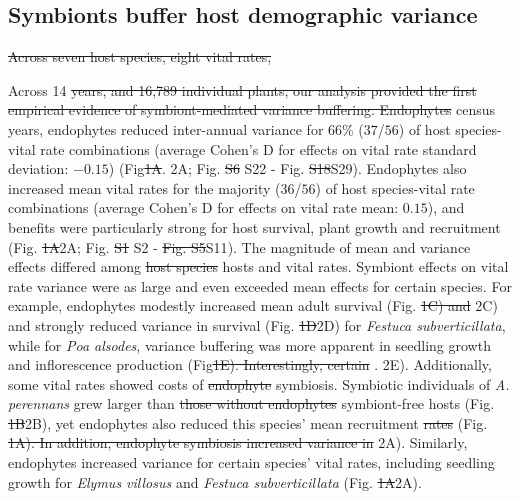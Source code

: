 \documentclass[lineno,sn-nature]{sn-jnl}%
\providecommand{\DIFadd}[1]{{\protect\color{blue}#1}} %
\providecommand{\DIFdel}[1]{{\protect\color{red}\protect\scriptsize\sout{#1}}}
\providecommand{\DIFadd}[1]{{\protect\color{blue}\uwave{#1}}} %
\providecommand{\DIFdel}[1]{{\protect\color{red}\sout{#1}}}                      %
\providecommand{\DIFaddbegin}{} %
\providecommand{\DIFaddend}{} %
\providecommand{\DIFdelbegin}{} %
\providecommand{\DIFdelend}{} %
\newcommand{\DIFscaledelfig}{0.5}
\newlength{\DIFdelgraphicswidth} %
\newlength{\DIFdelgraphicsheight} %
\newcommand{\DIFaddincludegraphics}[2][]{{\color{blue}\fbox{\DIFOincludegraphics[#1]{#2}}}} %
\newcommand{\DIFdelincludegraphics}[2][]{%
\sbox{\DIFdelgraphicsbox}{\DIFOincludegraphics[#1]{#2}}%
\settoboxwidth{\DIFdelgraphicswidth}{\DIFdelgraphicsbox} %
\settoboxtotalheight{\DIFdelgraphicsheight}{\DIFdelgraphicsbox} %
\scalebox{\DIFscaledelfig}{%
\parbox[b]{\DIFdelgraphicswidth}{\usebox{\DIFdelgraphicsbox}\\[-\baselineskip] \rule{\DIFdelgraphicswidth}{0em}}\llap{\resizebox{\DIFdelgraphicswidth}{\DIFdelgraphicsheight}{%
\setlength{\unitlength}{\DIFdelgraphicswidth}%
\begin{picture}(1,1)%
\thicklines\linethickness{2pt} %
{\color[rgb]{1,0,0}\put(0,0){\framebox(1,1){}}}%
{\color[rgb]{1,0,0}\put(0,0){\line( 1,1){1}}}%
{\color[rgb]{1,0,0}\put(0,1){\line(1,-1){1}}}%
\end{picture}%
}\hspace*{3pt}}} %
} %
\DeclareRobustCommand{\DIFaddbegin}{\DIFOaddbegin \let\includegraphics\DIFaddincludegraphics} %
\DeclareRobustCommand{\DIFaddend}{\DIFOaddend \let\includegraphics\DIFOincludegraphics} %
\DeclareRobustCommand{\DIFdelbegin}{\DIFOdelbegin \let\includegraphics\DIFdelincludegraphics} %
\DeclareRobustCommand{\DIFdelend}{\DIFOaddend \let\includegraphics\DIFOincludegraphics} %
\begin{document}
\subsection*{Symbionts buffer host demographic variance}

\DIFdelbegin \DIFdel{Across seven host species, eight vital rates, }\DIFdelend \DIFaddbegin 

\DIFadd{Across }\DIFaddend 14 \DIFdelbegin \DIFdel{years, and 16,789 individual plants, our analysis provided the first empirical evidence of symbiont-mediated variance buffering. 
Endophytes }\DIFdelend \DIFaddbegin \DIFadd{census years, endophytes }\DIFaddend reduced inter-annual variance for 66\% ($37$/$56$) of host species-vital rate combinations (average Cohen's D for effects on vital rate standard deviation: $-0.15$) (Fig\DIFdelbegin \DIFdel{1A}\DIFdelend \DIFaddbegin \DIFadd{. 2A}\DIFaddend ; Fig. \DIFdelbegin \DIFdel{S6 }\DIFdelend \DIFaddbegin \DIFadd{S22 }\DIFaddend - Fig. \DIFdelbegin \DIFdel{S18}\DIFdelend \DIFaddbegin \DIFadd{S29}\DIFaddend ). 
Endophytes also increased mean vital rates for the majority ($36$/$56$) of host species-vital rate combinations (average Cohen's D for effects on vital rate mean: $0.15$), and benefits were particularly strong for host survival, plant growth and recruitment (Fig. \DIFdelbegin \DIFdel{1A}\DIFdelend \DIFaddbegin \DIFadd{2A}\DIFaddend ; Fig. \DIFdelbegin \DIFdel{S1 }\DIFdelend \DIFaddbegin \DIFadd{S2 }\DIFaddend - \DIFdelbegin \DIFdel{Fig. S5}\DIFdelend \DIFaddbegin \DIFadd{S11}\DIFaddend ).
The magnitude of mean and variance effects differed among \DIFdelbegin \DIFdel{host species }\DIFdelend \DIFaddbegin \DIFadd{hosts }\DIFaddend and vital rates. 
\DIFaddbegin \DIFadd{Symbiont effects on vital rate variance were as large and even exceeded mean effects for certain species.
}\DIFaddend For example, endophytes modestly increased mean adult survival (Fig. \DIFdelbegin \DIFdel{1C) and }\DIFdelend \DIFaddbegin \DIFadd{2C) and strongly }\DIFaddend reduced variance in survival (Fig. \DIFdelbegin \DIFdel{1D}\DIFdelend \DIFaddbegin \DIFadd{2D}\DIFaddend ) for \emph{Festuca subverticillata}, while for \emph{Poa alsodes}, variance buffering was more apparent in seedling growth and inflorescence production (Fig\DIFdelbegin \DIFdel{1E). 
Interestingly, certain }\DIFdelend \DIFaddbegin \DIFadd{. 2E). 
Additionally, some }\DIFaddend vital rates showed costs of \DIFdelbegin \DIFdel{endophyte }\DIFdelend symbiosis. 
Symbiotic individuals of \emph{A. perennans} grew larger than \DIFdelbegin \DIFdel{those without endophytes }\DIFdelend \DIFaddbegin \DIFadd{symbiont-free hosts }\DIFaddend (Fig. \DIFdelbegin \DIFdel{1B}\DIFdelend \DIFaddbegin \DIFadd{2B}\DIFaddend ), yet endophytes also reduced this species' mean recruitment \DIFdelbegin \DIFdel{rates }\DIFdelend (Fig. \DIFdelbegin \DIFdel{1A). 
In addition, endophyte symbiosis increased variance in }\DIFdelend \DIFaddbegin \DIFadd{2A). 
Similarly, endophytes increased variance for certain species' vital rates, including }\DIFaddend seedling growth for \emph{Elymus villosus} and \emph{Festuca subverticillata} (Fig. \DIFdelbegin \DIFdel{1A}\DIFdelend \DIFaddbegin \DIFadd{2A}\DIFaddend ).
\end{document}
